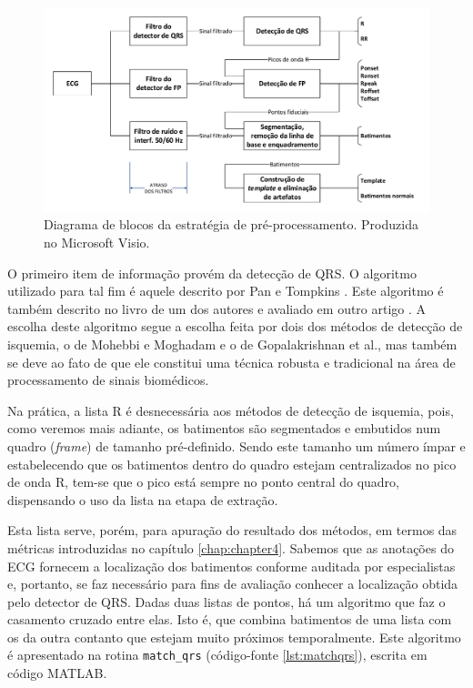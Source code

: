 \begin{figure}[ht]
    \centering
    \includegraphics[width=450pt]{figures/chap6-preprocessing-diagram.pdf}
    \caption[Diagrama de blocos da estratégia de pré-processamento]{Diagrama de blocos da estratégia de pré-processamento. Produzida no Microsoft Visio.}
    \label{fig:preprocessdiag}
\end{figure}

O primeiro item de informação provém da detecção de QRS. O algoritmo utilizado para tal fim é aquele descrito por Pan e Tompkins \cite{Pan1985}. Este algoritmo é também descrito no livro de um dos autores \cite[pp. 245-262]{Tompkins1993} e avaliado em outro artigo \cite{Hamilton1986}. A escolha deste algoritmo segue a escolha feita por dois dos métodos de detecção de isquemia, o de Mohebbi e Moghadam e o de Gopalakrishnan et al., mas também se deve ao fato de que ele constitui uma técnica robusta e tradicional na área de processamento de sinais biomédicos.

Na prática, a lista R é desnecessária aos métodos de detecção de isquemia, pois, como veremos mais adiante, os batimentos são segmentados e embutidos num quadro (\emph{frame}) de tamanho pré-definido. Sendo este tamanho um número ímpar e estabelecendo que os batimentos dentro do quadro estejam centralizados no pico de onda R, tem-se que o pico está sempre no ponto central do quadro, dispensando o uso da lista na etapa de extração.

Esta lista serve, porém, para apuração do resultado dos métodos, em termos das métricas introduzidas no capítulo \ref{chap:chapter4}. Sabemos que as anotações do ECG fornecem a localização dos batimentos conforme auditada por especialistas e, portanto, se faz necessário para fins de avaliação conhecer a localização obtida pelo detector de QRS. Dadas duas listas de pontos, há um algoritmo que faz o casamento cruzado entre elas. Isto é, que combina batimentos de uma lista com os da outra contanto que estejam muito próximos temporalmente. Este algoritmo é apresentado na rotina \texttt{match\_qrs} (código-fonte \ref{lst:matchqrs}), escrita em código MATLAB.

